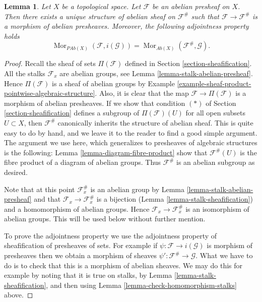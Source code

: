 \documentclass{stacks-project}
\theoremstyle{plain}
\newtheorem{lemma}[subsection]{Lemma}
\theoremstyle{definition}
\theoremstyle{remark}
\numberwithin{equation}{subsection}
\def\Mor{\mathop{\mathrm{Mor}}\nolimits}
\begin{document}
\begin{lemma}
\label{lemma-sheafify-abelian-presheaf}
Let $X$ be a topological space.
Let $\mathcal{F}$ be an abelian presheaf on $X$.
Then there exists a unique structure of
abelian sheaf on $\mathcal{F}^\#$ such that
$\mathcal{F} \to \mathcal{F}^\#$ is a morphism
of abelian presheaves. Moreover, the following adjointness
property holds
$$
\Mor_{\textit{PAb}(X)}(\mathcal{F}, i(\mathcal{G}))
=
\Mor_{\textit{Ab}(X)}(\mathcal{F}^\#, \mathcal{G}).
$$
\end{lemma}

\begin{proof}
Recall the sheaf of sets $\Pi(\mathcal{F})$ defined in
Section \ref{section-sheafification}. All the stalks
$\mathcal{F}_x$ are abelian groups, see
Lemma \ref{lemma-stalk-abelian-presheaf}.
Hence $\Pi(\mathcal{F})$ is a sheaf of abelian groups by
Example \ref{example-sheaf-product-pointwise-algebraic-structure}.
Also, it is clear that the map $\mathcal{F} \to \Pi(\mathcal{F})$
is a morphism of abelian presheaves. If we show that
condition $(*)$ of Section \ref{section-sheafification} defines a subgroup
of $\Pi(\mathcal{F})(U)$ for all open subsets $U \subset X$,
then $\mathcal{F}^\#$ canonically inherits the structure of abelian sheaf.
This is quite easy to do by hand, and we leave it to the
reader to find a good simple argument. The argument we use here,
which generalizes to presheaves of algebraic structures is the following:
Lemma \ref{lemma-diagram-fibre-product} show that
$\mathcal{F}^\#(U)$ is the fibre product of a diagram
of abelian groups. Thus $\mathcal{F}^\#$ is an abelian
subgroup as desired.

\medskip\noindent
Note that at this point $\mathcal{F}^\#_x$ is an abelian
group by Lemma \ref{lemma-stalk-abelian-presheaf}
and that $\mathcal{F}_x \to \mathcal{F}^\#_x$ is a
bijection (Lemma \ref{lemma-stalk-sheafification})
and a homomorphism of abelian groups. Hence
$\mathcal{F}_x \to \mathcal{F}^\#_x$ is an isomorphism
of abelian groups. This will be used below without further mention.

\medskip\noindent
To prove the adjointness property we use the adjointness
property of sheafification of presheaves of sets. For example
if $\psi : \mathcal{F} \to i(\mathcal{G})$ is morphism of presheaves
then we obtain a morphism of sheaves
$\psi' : \mathcal{F}^\# \to \mathcal{G}$. What we have to do is to check
that this is a morphism of abelian sheaves. We may do this
for example by noting that it is true on stalks,
by Lemma \ref{lemma-stalk-sheafification}, and then using
Lemma \ref{lemma-check-homomorphism-stalks} above.
\end{proof}
\end{document}
